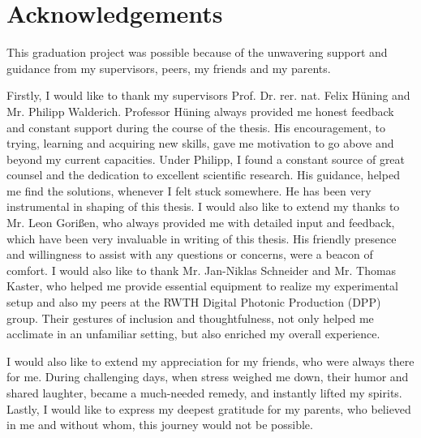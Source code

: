 \chapter*{Acknowledgements}
This graduation project was possible because of the unwavering support and guidance from my supervisors, peers, my friends and my parents.

\vspace{5mm}

\noindent Firstly, I would like to thank my supervisors Prof. Dr. rer. nat. Felix Hüning and Mr. Philipp Walderich. Professor Hüning always provided me honest feedback and constant support during the course of the thesis. His encouragement, to trying, learning and acquiring new skills, gave me motivation to go above and beyond my current capacities. Under Philipp, I found a constant source of great counsel and the dedication to excellent scientific research. His guidance, helped me find the solutions, whenever I felt stuck somewhere. He has been very instrumental in shaping of this thesis. I would also like to extend my thanks to Mr. Leon Gorißen, who always provided me with detailed input and feedback, which have been very invaluable in writing of this thesis. His friendly presence and willingness to assist with any questions or concerns, were a beacon of comfort. I would also like to thank Mr. Jan-Niklas Schneider and Mr. Thomas Kaster, who helped me provide essential equipment to realize my experimental setup and also my peers at the RWTH Digital Photonic Production (DPP) group. Their gestures of inclusion and thoughtfulness, not only helped me acclimate in an unfamiliar setting, but also enriched my overall experience.

\vspace{5mm}

\noindent I would also like to extend my appreciation for my friends, who were always there for me. During challenging days, when stress weighed me down, their humor and shared laughter, became a much-needed remedy, and instantly lifted my spirits. Lastly, I would like to express my deepest gratitude for my parents, who believed in me and without whom, this journey would not be possible.
